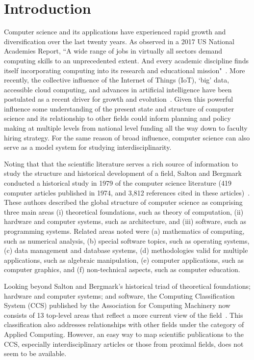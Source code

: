 \section{Introduction}
\label{intro}

Computer science and its applications have experienced rapid growth and diversification over the last twenty years. As observed in a 2017 US National Academies Report, ``A wide range of jobs in virtually all sectors demand computing skills to an unprecedented extent. And every academic discipline finds itself incorporating computing into its research and educational mission"~\cite{nas_2017}. More recently, the collective influence of the Internet of Things (IoT), `big' data, accessible cloud computing, and advances in artificial intelligence have been postulated as a recent driver for growth and evolution~\cite{siebel2019_digital}. Given this powerful influence some understanding of the present state and structure of computer science and its relationship to other fields could inform planning and policy making at multiple levels from national level funding all the way down to faculty hiring strategy. For the same reason of broad influence, computer science can also serve as a model system for studying interdisciplinarity. 

Noting that that the scientific literature serves a rich source of information to study the structure and historical development of a field, 
Salton and Bergmark conducted a historical study  in 1979 of the computer science literature (419 computer articles published in 1974,  and 3,812 references cited in these articles)~\cite{salton_citation_1979}. These authors described the global structure of computer science as comprising three main areas (i) theoretical foundations, such as theory of computation, (ii) hardware and computer systems, such as architecture,  and (iii) software, such as programming systems.  Related areas noted were (a) mathematics of computing, such as numerical analysis, (b) special software topics, such as operating systems, (c) data management and database systems, (d) methodologies valid for multiple applications, such as algebraic manipulation, (e) computer applications, such as computer graphics, and  (f) non-technical aspects, such as computer education. 

Looking beyond Salton and Bergmark's historical triad of theoretical foundations; hardware and computer systems; and software, the Computing Classification System (CCS) published by the Association for Computing Machinery now consists of 13 top-level areas that reflect a more current view of the field~\cite{acm_ref}. This classification also addresses relationships with other fields under the category of Applied Computing. However, an easy way to map scientific publications to the CCS, especially interdisciplinary articles or those from proximal fields, does not seem to be available. 

